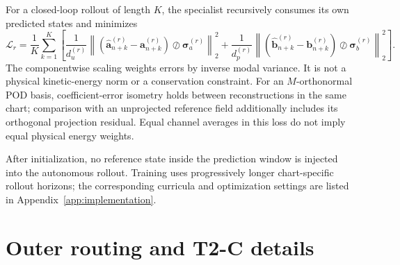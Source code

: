 \documentclass{article}
\begin{document}
For a closed-loop rollout of length $K$, the specialist recursively
consumes its own predicted states and minimizes
\begin{equation}
  \mathcal L_r
  =
  \frac{1}{K}
  \sum_{k=1}^{K}
  \left[
    \frac{1}{d_u^{(r)}}
    \left\|
      \left(
        \widehat{\bm a}_{n+k}^{(r)}
        -
        \bm a_{n+k}^{(r)}
      \right)
      \oslash
      \bm\sigma_a^{(r)}
    \right\|_2^2
    +
    \frac{1}{d_p^{(r)}}
    \left\|
      \left(
        \widehat{\bm b}_{n+k}^{(r)}
        -
        \bm b_{n+k}^{(r)}
      \right)
      \oslash
      \bm\sigma_b^{(r)}
    \right\|_2^2
  \right].
  \label{eq:app_true_rollout_loss}
\end{equation}
The componentwise scaling weights errors by inverse modal variance. It is not a physical kinetic-energy norm or a conservation constraint. For an $M$-orthonormal POD basis, coefficient-error isometry holds between reconstructions in the same chart; comparison with an unprojected reference field additionally includes its orthogonal projection residual. Equal channel averages in this loss do not imply equal physical energy weights.

After initialization, no reference state inside the prediction window is
injected into the autonomous rollout. Training uses progressively longer
chart-specific rollout horizons; the corresponding curricula and
optimization settings are listed in Appendix~\ref{app:implementation}.

\section{Outer routing and T2-C details}
\label{app:routing}
\end{document}
